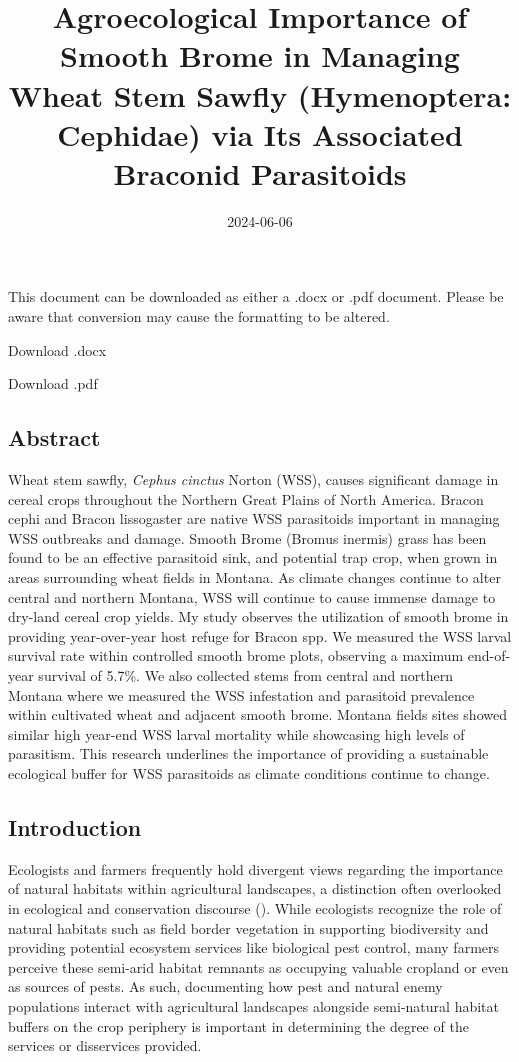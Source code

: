 \documentclass[
]{article}
\title{Agroecological Importance of Smooth Brome in Managing Wheat Stem
Sawfly (Hymenoptera: Cephidae) via Its Associated Braconid Parasitoids}
\author{}
\date{\vspace{-2.5em}2024-06-06}
\begin{document}
\maketitle

This document can be downloaded as either a .docx or .pdf document.
Please be aware that conversion may cause the formatting to be altered.

Download .docx

Download .pdf

\subsection{Abstract}\label{abstract}

Wheat stem sawfly, \emph{Cephus cinctus} Norton (WSS), causes
significant damage in cereal crops throughout the Northern Great Plains
of North America. Bracon cephi and Bracon lissogaster are native WSS
parasitoids important in managing WSS outbreaks and damage. Smooth Brome
(Bromus inermis) grass has been found to be an effective parasitoid
sink, and potential trap crop, when grown in areas surrounding wheat
fields in Montana. As climate changes continue to alter central and
northern Montana, WSS will continue to cause immense damage to dry-land
cereal crop yields. My study observes the utilization of smooth brome in
providing year-over-year host refuge for Bracon spp. We measured the WSS
larval survival rate within controlled smooth brome plots, observing a
maximum end-of-year survival of 5.7\%. We also collected stems from
central and northern Montana where we measured the WSS infestation and
parasitoid prevalence within cultivated wheat and adjacent smooth brome.
Montana fields sites showed similar high year-end WSS larval mortality
while showcasing high levels of parasitism. This research underlines the
importance of providing a sustainable ecological buffer for WSS
parasitoids as climate conditions continue to change.

\subsection{Introduction}\label{introduction}

Ecologists and farmers frequently hold divergent views regarding the
importance of natural habitats within agricultural landscapes, a
distinction often overlooked in ecological and conservation discourse
(). While
ecologists recognize the role of natural habitats such as field border
vegetation in supporting biodiversity and providing potential ecosystem
services like biological pest control, many farmers perceive these
semi-arid habitat remnants as occupying valuable cropland or even as
sources of pests. As such, documenting how pest and natural enemy
populations interact with agricultural landscapes alongside semi-natural
habitat buffers on the crop periphery is important in determining the
degree of the services or disservices provided.
\end{document}
